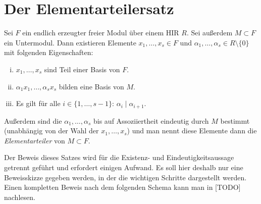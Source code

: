 
\chapter{Der Elementarteilersatz}
\begin{thSatz}[Elementarteilersatz]
    Sei $F$ ein endlich erzeugter freier Modul über einem HIR $R$. Sei außerdem
    $M\subset F$ ein Untermodul. Dann existieren Elemente $x_1,\ldots,x_s\in F$
    und $\alpha_1,\ldots,\alpha_s\in R\setminus\{0\}$ mit folgenden
    Eigenschaften:
    \begin{enumerate}[i)]
        \item
            $x_1,\ldots,x_s$ sind Teil einer Basis von $F$.
        \item
            $\alpha_1 x_1, \ldots, \alpha_s x_s$ bilden eine Basis von $M$.
        \item
            Es gilt für alle $i\in\{1,\ldots,s-1\}$:\; $\alpha_i\mid\alpha_{i+1}$.
    \end{enumerate}
    Außerdem sind die $\alpha_1,\ldots,\alpha_s$ bis auf Assoziiertheit
    eindeutig durch $M$ bestimmt (unabhängig von der Wahl der $x_1,\ldots,x_s$)
    und man nennt diese Elemente dann die \emph{Elementarteiler} von 
    $M\subset F$.
\end{thSatz}

Der Beweis dieses Satzes wird für die Existenz- und Eindeutigkeitsaussage
getrennt geführt und erfordert einigen Aufwand. Es soll hier deshalb nur eine
Beweisskizze gegeben werden, in der die wichtigen Schritte dargestellt werden.
Einen kompletten Beweis nach dem folgenden Schema kann man in 
[TODO]
nachlesen.

